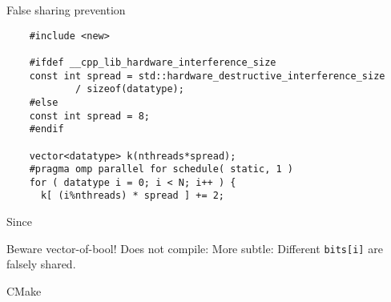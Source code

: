 \documentclass[10pt]{beamer}
\begin{document}
\begin{numberedframe}{False sharing prevention}
  \begin{lstlisting}
    #include <new>

    #ifdef __cpp_lib_hardware_interference_size
    const int spread = std::hardware_destructive_interference_size
            / sizeof(datatype);
    #else
    const int spread = 8;
    #endif

    vector<datatype> k(nthreads*spread);
    #pragma omp parallel for schedule( static, 1 )
    for ( datatype i = 0; i < N; i++ ) {
      k[ (i%nthreads) * spread ] += 2;
  \end{lstlisting}
  Since 
\end{numberedframe}

\begin{numberedframe}{Beware vector-of-bool!}
  Does not compile:
  More subtle:
  Different \lstinline{bits[i]} are falsely shared.
\end{numberedframe}

\begin{numberedframe}{CMake}
  
\end{numberedframe}
\end{document}
